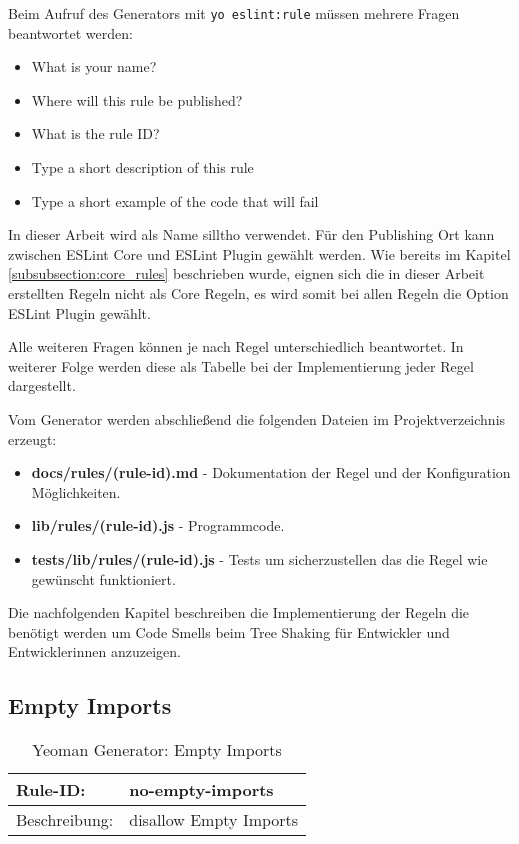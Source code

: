 Beim Aufruf des Generators mit \lstinline{yo eslint:rule} müssen mehrere Fragen beantwortet werden:

\begin{itemize}
	\item What is your name?
    \item Where will this rule be published?
    \item What is the rule ID?
    \item Type a short description of this rule
    \item Type a short example of the code that will fail
\end{itemize}

In dieser Arbeit wird als Name silltho verwendet. Für den Publishing Ort kann zwischen ESLint Core und ESLint Plugin gewählt werden. Wie bereits im Kapitel \ref{subsubsection:core_rules} beschrieben wurde, eignen sich die in dieser Arbeit erstellten Regeln nicht als Core Regeln, es wird somit bei allen Regeln die Option ESLint Plugin gewählt. 

Alle weiteren Fragen können je nach Regel unterschiedlich beantwortet. In weiterer Folge werden diese als Tabelle bei der Implementierung jeder Regel dargestellt.

Vom Generator werden abschließend die folgenden Dateien im Projektverzeichnis erzeugt:
\begin{itemize}
	\item \textbf{docs/rules/(rule-id).md} - Dokumentation der Regel und der Konfiguration Möglichkeiten.
    \item \textbf{lib/rules/(rule-id).js} - Programmcode.
    \item \textbf{tests/lib/rules/(rule-id).js} - Tests um sicherzustellen das die Regel wie gewünscht funktioniert.
\end{itemize}

Die nachfolgenden Kapitel beschreiben die Implementierung der Regeln die benötigt werden um Code Smells beim Tree Shaking für Entwickler und Entwicklerinnen anzuzeigen.

\subsection{Empty Imports}

\begin{table}[H]
\centering
\caption{Yeoman Generator: Empty Imports}
\label{tbl:empty_imports}
\begin{tabular}{|l|l|}
\hline
Rule-ID: & no-empty-imports \\ \hline
Beschreibung: & disallow Empty Imports \\ \hline
\end{tabular}
\end{table}

